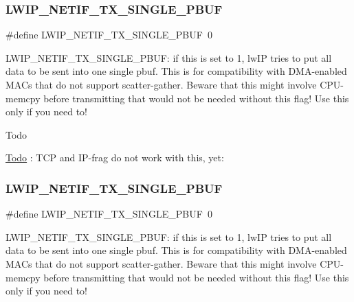\subsubsection{\texorpdfstring{L\+W\+I\+P\+\_\+\+N\+E\+T\+I\+F\+\_\+\+T\+X\+\_\+\+S\+I\+N\+G\+L\+E\+\_\+\+P\+B\+UF}{LWIP\_NETIF\_TX\_SINGLE\_PBUF}\hspace{0.1cm}{\footnotesize\ttfamily [1/2]}}
{\footnotesize\ttfamily \#define L\+W\+I\+P\+\_\+\+N\+E\+T\+I\+F\+\_\+\+T\+X\+\_\+\+S\+I\+N\+G\+L\+E\+\_\+\+P\+B\+UF~0}

L\+W\+I\+P\+\_\+\+N\+E\+T\+I\+F\+\_\+\+T\+X\+\_\+\+S\+I\+N\+G\+L\+E\+\_\+\+P\+B\+UF\+: if this is set to 1, lw\+IP tries to put all data to be sent into one single pbuf. This is for compatibility with D\+M\+A-\/enabled M\+A\+Cs that do not support scatter-\/gather. Beware that this might involve C\+P\+U-\/memcpy before transmitting that would not be needed without this flag! Use this only if you need to!

\begin{DoxyRefDesc}{Todo}
\item[\hyperlink{todo__todo000022}{Todo}]\+: T\+CP and I\+P-\/frag do not work with this, yet\+: \end{DoxyRefDesc}
\mbox{\label{group__lwip__opts__netif_gabafb9f64a80e51b56c0abbcfc1f7e04e}} 
\subsubsection{\texorpdfstring{L\+W\+I\+P\+\_\+\+N\+E\+T\+I\+F\+\_\+\+T\+X\+\_\+\+S\+I\+N\+G\+L\+E\+\_\+\+P\+B\+UF}{LWIP\_NETIF\_TX\_SINGLE\_PBUF}\hspace{0.1cm}{\footnotesize\ttfamily [2/2]}}
{\footnotesize\ttfamily \#define L\+W\+I\+P\+\_\+\+N\+E\+T\+I\+F\+\_\+\+T\+X\+\_\+\+S\+I\+N\+G\+L\+E\+\_\+\+P\+B\+UF~0}

L\+W\+I\+P\+\_\+\+N\+E\+T\+I\+F\+\_\+\+T\+X\+\_\+\+S\+I\+N\+G\+L\+E\+\_\+\+P\+B\+UF\+: if this is set to 1, lw\+IP tries to put all data to be sent into one single pbuf. This is for compatibility with D\+M\+A-\/enabled M\+A\+Cs that do not support scatter-\/gather. Beware that this might involve C\+P\+U-\/memcpy before transmitting that would not be needed without this flag! Use this only if you need to!

